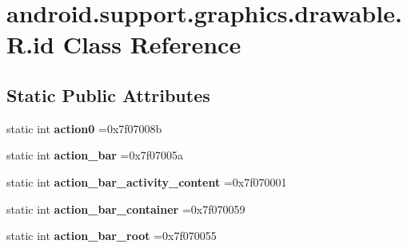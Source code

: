 \hypertarget{classandroid_1_1support_1_1graphics_1_1drawable_1_1R_1_1id}{}\section{android.\+support.\+graphics.\+drawable.\+R.\+id Class Reference}
\label{classandroid_1_1support_1_1graphics_1_1drawable_1_1R_1_1id}
\subsection*{Static Public Attributes}
\begin{DoxyCompactItemize}
\item 
\mbox{\label{classandroid_1_1support_1_1graphics_1_1drawable_1_1R_1_1id_a922bcebf511c136a1e562995a1b5173b}} 
static int {\bfseries action0} =0x7f07008b
\item 
\mbox{\label{classandroid_1_1support_1_1graphics_1_1drawable_1_1R_1_1id_aa22b3d0748cd8ce706e121ff9d78837a}} 
static int {\bfseries action\+\_\+bar} =0x7f07005a
\item 
\mbox{\label{classandroid_1_1support_1_1graphics_1_1drawable_1_1R_1_1id_a6fefed18e5fa4c0e23a6d5d5aae6049c}} 
static int {\bfseries action\+\_\+bar\+\_\+activity\+\_\+content} =0x7f070001
\item 
\mbox{\label{classandroid_1_1support_1_1graphics_1_1drawable_1_1R_1_1id_a4cd39425c5509bfe8837934941f988a9}} 
static int {\bfseries action\+\_\+bar\+\_\+container} =0x7f070059
\item 
\mbox{\label{classandroid_1_1support_1_1graphics_1_1drawable_1_1R_1_1id_a4ba0dcb361ae182240cb52d584c52496}} 
static int {\bfseries action\+\_\+bar\+\_\+root} =0x7f070055
\item 
\mbox{\label{classandroid_1_1support_1_1graphics_1_1drawable_1_1R_1_1id_a8a33ec9e59886d53494007bb22764439}} 

\end{DoxyCompactItemize}
